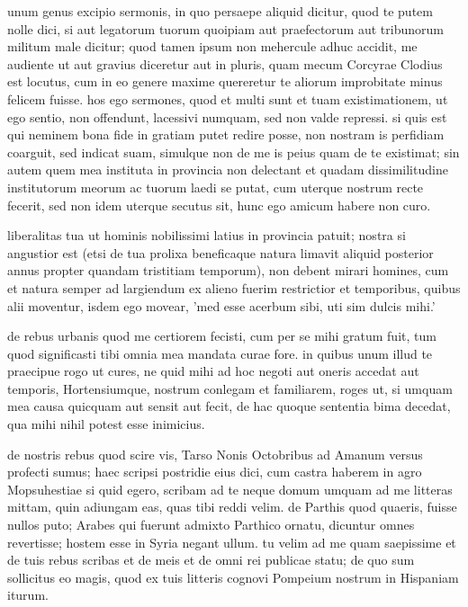  unum genus excipio sermonis, in quo persaepe aliquid dicitur, quod te putem nolle dici, si aut legatorum tuorum quoipiam aut praefectorum aut tribunorum militum male dicitur; quod tamen ipsum non mehercule adhuc accidit, me audiente ut aut gravius diceretur aut in pluris, quam mecum Corcyrae Clodius est locutus, cum in eo genere maxime quereretur te aliorum improbitate minus felicem fuisse. hos ego sermones, quod et multi sunt et tuam existimationem, ut ego sentio, non offendunt, lacessivi numquam, sed non valde repressi. si quis est qui neminem bona fide in gratiam putet redire posse, non nostram is perfidiam coarguit, sed indicat suam, simulque non de me is peius quam de te existimat; sin autem quem mea instituta in provincia non delectant et quadam dissimilitudine institutorum meorum ac tuorum laedi se putat, cum uterque nostrum recte fecerit, sed non idem uterque secutus sit, hunc ego amicum habere non curo.

 liberalitas tua ut hominis nobilissimi latius in provincia patuit; nostra si angustior est (etsi de tua prolixa beneficaque natura limavit aliquid posterior annus propter quandam tristitiam temporum), non debent mirari homines, cum et natura semper ad largiendum ex alieno fuerim restrictior et temporibus, quibus alii moventur, isdem ego movear, 'med esse acerbum sibi, uti sim dulcis mihi.'

 de rebus urbanis quod me certiorem fecisti, cum per se mihi gratum fuit, tum quod significasti tibi omnia mea mandata curae fore. in quibus unum illud te praecipue rogo ut cures, ne quid mihi ad hoc negoti aut oneris accedat aut temporis, Hortensiumque, nostrum conlegam et familiarem, roges ut, si umquam mea causa quicquam aut sensit aut fecit, de hac quoque sententia bima decedat, qua mihi nihil potest esse inimicius.

 de nostris rebus quod scire vis, Tarso Nonis Octobribus ad Amanum versus profecti sumus; haec scripsi postridie eius dici, cum castra haberem in agro Mopsuhestiae si quid egero, scribam ad te neque domum umquam ad me litteras mittam, quin adiungam eas, quas tibi reddi velim. de Parthis quod quaeris, fuisse nullos puto; Arabes qui fuerunt admixto Parthico ornatu, dicuntur omnes revertisse; hostem esse in Syria negant ullum. tu velim ad me quam saepissime et de tuis rebus scribas et de meis et de omni rei publicae statu; de quo sum sollicitus eo magis, quod ex tuis litteris cognovi Pompeium nostrum in Hispaniam iturum.
